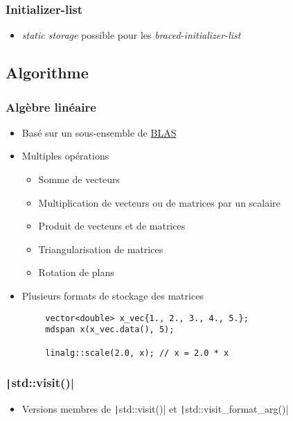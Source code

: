 \documentclass[C++.tex]{subfiles}
\begin{document}
\begin{frame}[fragile]
	\frametitle{Initializer-list}
	\begin{itemize}
		\item \textit{static storage} possible pour les \textit{braced-initializer-list}
		
	\end{itemize}
\end{frame}

\subsection*{Algorithme}
\begin{frame}[fragile]
	\frametitle{Algèbre linéaire}
	\begin{itemize}
		\item Basé sur un sous-ensemble de \href{https://www.netlib.org/blas/}{BLAS\linklogo}
		\item Multiples opérations
		\begin{itemize}
			\item Somme de vecteurs
			\item Multiplication de vecteurs ou de matrices par un scalaire
			\item Produit de vecteurs et de matrices
			\item Triangularisation de matrices
			\item Rotation de plans
		\end{itemize}
		\item Plusieurs formats de stockage des matrices
	\end{itemize}

	\begin{verbatim}
		vector<double> x_vec{1., 2., 3., 4., 5.};
		mdspan x(x_vec.data(), 5);

		linalg::scale(2.0, x); // x = 2.0 * x
	\end{verbatim}

\end{frame}

\begin{frame}[fragile]
	\frametitle{\texttt|std::visit()|}
	\begin{itemize}
		\item Versions membres de \texttt|std::visit()| et \texttt|std::visit_format_arg()|
	\end{itemize}
\end{frame}
\end{document}
